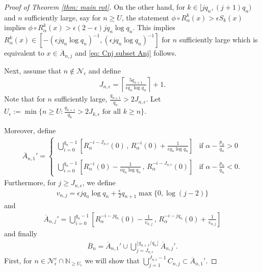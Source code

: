 \documentclass[11pt]{amsart}
\theoremstyle{definition}
\numberwithin{equation}{section}
\begin{document}
\begin{proof}[Proof of Theorem \ref{thm: main rot}]
On the other hand, for $k\in  [jq_n, (j+1)q_n)$ and $n$ sufficiently large, say for $n\geq U$, the statement $\phi\circ R_{\alpha}^k(x)>\epsilon S_k(x)$ implies 
$\phi\circ R_{\alpha}^k(x)>\epsilon (2-\epsilon) jq_n\log q_n$. This implies 
$R_{\alpha}^k(x)\in [-(\epsilon  jq_n\log  q_n)^{-1}, (\epsilon  jq_n\log q_n)^{-1}]$ for $n$ sufficiently large which is equivalent to
$ x\in \overline{A}_{n,j}$
and \eqref{eq: Cnj subset Anj} follows. 
\newline 

Next, assume that $n\notin \mathcal{N}_{\epsilon}$ and define 
\begin{align*}
 J_{n,\epsilon}= \left\lceil \frac{ 5 q_{n+1}}{\epsilon q_n \log q_n}\right\rceil+1.
\end{align*}
Note that for $n$ sufficiently large, $\frac{q_{n+1}}{q_n}> 2J_{n,\epsilon}$. 
Let $U_\epsilon:=\min\{n\geq U: \frac{q_{k+1}}{q_k}> 2J_{k,\epsilon}\text{ for all }k\geq n\}$. 


Moreover, define 
\begin{align*}
 \overline{A}_{n,1}'=\begin{cases}
                      \bigcup_{i=0}^{q_n-1}\left[R_{\alpha}^{-i-J_{n,\epsilon}}(0)\,,\, R_{\alpha}^{-i}(0)+\frac{1}{\epsilon q_n\log q_n}\right] 
                      &\text{if }\alpha-\frac{p_n}{q_n}>0\\
                      &\\
                      \bigcup_{i=0}^{q_n-1}\left[R_{\alpha}^{-i}(0)-\frac{1}{\epsilon q_n\log q_n}\,,\, R_{\alpha}^{-i-J_{n,\epsilon}}(0)\right] 
                      &\text{if }\alpha-\frac{p_n}{q_n}<0. 
                     \end{cases}
\end{align*}
Furthermore, for $j\geq J_{n,\epsilon}$, we define 
\begin{align*}
 v_{n,j}=\epsilon j q_n\log q_n+\frac{\epsilon}{2} q_{n+1} \max\{0,\log(j-2)\}
\end{align*}
and
\begin{align*}
 \overline{A}_{n,j}'
 =\bigcup_{i=0}^{q_{n}-1} 
  \left[ R_{\alpha}^{-i-jq_n}(0)-\frac{1}{v_{n,j}}\, ,\, R_{\alpha}^{-i-jq_n}(0) + \frac{1}{v_{n,j}}\right]
\end{align*}
and finally
\begin{align}
 \overline{B}_n=\overline{A}_{n,1}'\cup \bigcup_{j=J_{n,\epsilon}}^{\lfloor q_{n+1}/q_n\rfloor} \overline{A}_{n,j}'.\label{eq: overline B 2nd Def}
\end{align}
First, for $n\in \mathcal{N}_{\epsilon}^c\cap\mathbb{N}_{\geq U_\epsilon}$ we will show that 
$\bigcup_{j=1}^{J_{n,\epsilon}-1} C_{n,j}\subset \overline{A}_{n,1}'$.  


\end{proof}
\end{document}
